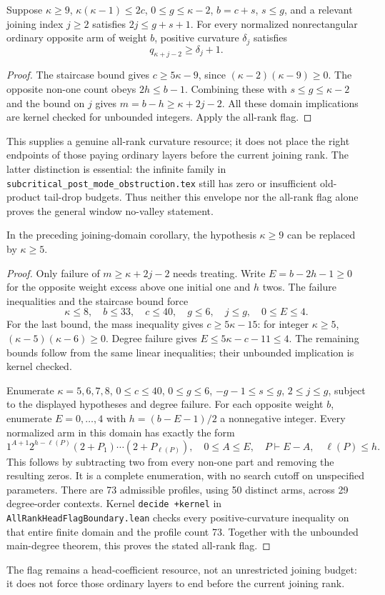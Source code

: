 \begin{corollary}
Suppose $\kappa\ge9$, $\kappa(\kappa-1)\le2c$,
$0\le g\le\kappa-2$, $b=c+s$, $s\le g$,
and a relevant joining index $j\ge2$ satisfies
$2j\le g+s+1$.
For every normalized nonrectangular ordinary opposite arm
of weight $b$, positive curvature $\delta_j$ satisfies
\[
                         q_{\kappa+j-2}\ge\delta_j+1.
\]
\end{corollary}
\begin{proof}
The staircase bound gives $c\ge5\kappa-9$, since
$(\kappa-2)(\kappa-9)\ge0$.
The opposite non-one count obeys $2h\le b-1$.
Combining these with $s\le g\le\kappa-2$ and the bound
on $j$ gives $m=b-h\ge\kappa+2j-2$.
All these domain implications are kernel checked for
unbounded integers. Apply the all-rank flag.
\end{proof}

This supplies a genuine all-rank curvature resource;
it does not place the right endpoints of those paying
ordinary layers before the current joining rank.
The latter distinction is essential: the infinite family
in \texttt{subcritical\_post\_mode\_obstruction.tex} still
has zero or insufficient old-product tail-drop budgets.
Thus neither this envelope nor the all-rank flag alone
proves the general window no-valley statement.

\begin{theorem}
In the preceding joining-domain corollary, the hypothesis
$\kappa\ge9$ can be replaced by $\kappa\ge5$.
\end{theorem}
\begin{proof}
Only failure of $m\ge\kappa+2j-2$ needs treating.
Write $E=b-2h-1\ge0$ for the opposite weight excess
above one initial one and $h$ twos.
The failure inequalities and the staircase bound force
\[
 \kappa\le8,\quad b\le33,\quad c\le40,\quad
 g\le6,\quad j\le g,\quad 0\le E\le4.
\]
For the last bound, the mass inequality gives
$c\ge5\kappa-15$: for integer $\kappa\ge5$,
$(\kappa-5)(\kappa-6)\ge0$.
Degree failure gives $E\le5\kappa-c-11\le4$.
The remaining bounds follow from the same linear
inequalities; their unbounded implication is kernel checked.

Enumerate $\kappa=5,6,7,8$, $0\le c\le40$,
$0\le g\le6$, $-g-1\le s\le g$, $2\le j\le g$,
subject to the displayed hypotheses and degree failure.
For each opposite weight $b$, enumerate $E=0,\ldots,4$
with $h=(b-E-1)/2$ a nonnegative integer.
Every normalized arm in this domain has exactly the form
\[
       1^{A+1}2^{h-\ell(P)}(2+P_1)\cdots(2+P_{\ell(P)}),
 \quad 0\le A\le E,\quad P\vdash E-A,\quad\ell(P)\le h.
\]
This follows by subtracting two from every non-one part
and removing the resulting zeros. It is a complete
enumeration, with no search cutoff on unspecified parameters.
There are 73 admissible profiles, using 50 distinct arms,
across 29 degree-order contexts. Kernel \texttt{decide +kernel}
in \texttt{AllRankHeadFlagBoundary.lean} checks every
positive-curvature inequality on that entire finite domain
and the profile count 73.
Together with the unbounded main-degree theorem, this
proves the stated all-rank flag.
\end{proof}

The flag remains a head-coefficient resource, not an
unrestricted joining budget: it does not force those
ordinary layers to end before the current joining rank.
